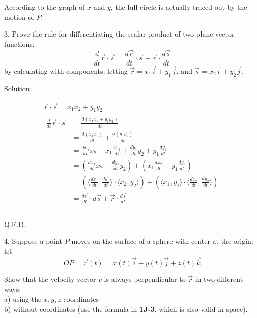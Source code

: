 \documentclass{article}
\begin{document}
According to the graph of $x$ and $y$, the full circle is actually traced out by 
the motion of $P$.

\bigskip

3. Prove the rule for differentiating the scalar product of two plane vector 
functions:
\begin{equation*}
  \frac{d}{dt} \vec{r} \cdot \vec{s} = \frac{d\vec{r}}{dt} \cdot \vec{s} + \vec{r} \cdot \frac{d\vec{s}}{dt}
\end{equation*}
by calculating with components, letting $\vec{r} = x_1 \vec{i} + y_1 \vec{j}$, 
and $\vec{s} = x_2 \vec{i} + y_2 \vec{j}$.

Solution:

\begin{gather*}
  \vec{r} \cdot \vec{s} = x_1 x_2 + y_1 y_2 \\
  \begin{split}
    \frac{d}{dt} \vec{r} \cdot \vec{s} &= \frac{d(x_1 x_2 + y_1 y_2)}{dt} \\
                                       &= \frac{d(x_1 x_2)}{dt} + \frac{d(y_1 y_2)}{dt} \\
                                       &= \frac{d x_1}{dt} x_2 + x_1 \frac{d x_2}{dt} + \frac{d y_1}{dt} y_2 + y_1 \frac{d y_2}{dt} \\
                                       &= (\frac{d x_1}{dt} x_2 + \frac{d y_1}{dt} y_2) + (x_1 \frac{d x_2}{dt} + y_1 \frac{d y_2}{dt}) \\
                                       &= (\langle \frac{d x_1}{dt}, \frac{d y_1}{dt} \rangle \cdot \langle x_2, y_2 \rangle) + (\langle x_1, y_1\rangle \cdot \langle \frac{d x_2}{dt}, \frac{d y_2}{dt}\rangle) \\
                                       &= \frac{d\vec{r}}{dt} \cdot d\vec{s} + \vec{r} \cdot \frac{d\vec{s}}{dt} \\
  \end{split} \\
\end{gather*}

Q.E.D.

\bigskip

4. Suppose a point $P$ moves on the surface of a sphere with center at the 
origin; let
\begin{equation*}
  OP = \vec{r}(t) = x(t) \vec{i} + y(t) \vec{j} + z(t) \vec{k}
\end{equation*}

Show that the velocity vector $v$ is always perpendicular to $\vec{r}$ in two 
different ways: \\
a) using the $x,y,z$-coordinates \\
b) without coordinates (use the formula in \textbf{1J-3}, which is also valid in 
space).
\end{document}
